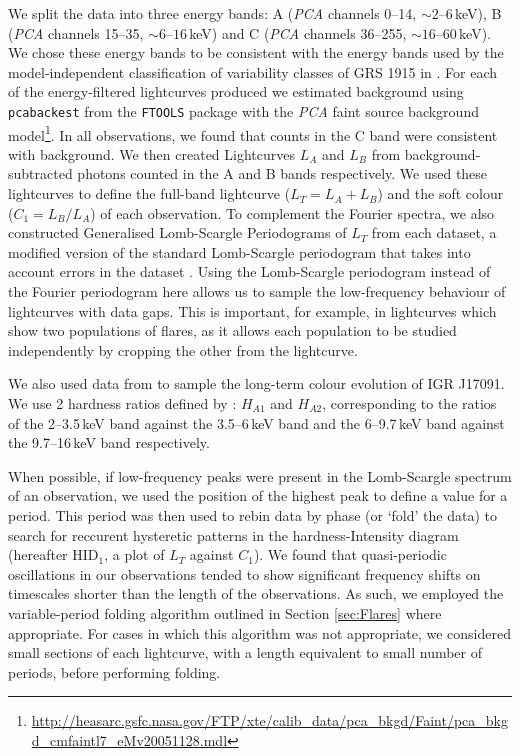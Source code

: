 \par We split the data into three energy bands: A (\textit{PCA} channels 0--14, $\sim2$--$6$\,keV), B (\textit{PCA} channels 15--35, $\sim6$--$16$\,keV) and C (\textit{PCA} channels 36--255, $\sim16$--$60$\,keV).  We chose these energy bands to be consistent with the energy bands used by the model-independent classification of variability classes of GRS 1915 in \citet{Belloni_GRS_MI}.  For each of the energy-filtered lightcurves produced we estimated background using \texttt{pcabackest} from the \texttt{FTOOLS} package \citep{Blackburn_FTools} with the \textit{PCA} faint source background model\footnote{\url{http://heasarc.gsfc.nasa.gov/FTP/xte/calib\_data/pca\_bkgd/Faint/pca\_bkgd\_cmfaintl7\_eMv20051128.mdl}}. In all observations, we found that counts in the C band were consistent with background.  We then created Lightcurves $L_A$ and $L_B$ from background-subtracted photons counted in the A and B bands respectively.  We used these lightcurves to define the full-band lightcurve ($L_T=L_A+L_B$) and the soft colour ($C_1=L_B/L_A$) of each observation.  To complement the Fourier spectra, we also constructed Generalised Lomb-Scargle Periodograms of $L_T$ from each dataset, a modified version of the standard Lomb-Scargle periodogram \citep{Lomb_LombScargle, Scargle_LombScargle} that takes into account errors in the dataset \citep{Irwin_LombScargle}.  Using the Lomb-Scargle periodogram instead of the Fourier periodogram here allows us to sample the low-frequency behaviour of lightcurves with data gaps.  This is important, for example, in lightcurves which show two populations of flares, as it allows each population to be studied independently by cropping the other from the lightcurve.
\par We also used data from \citealt{Altamirano_IGR_FH} to sample the long-term colour evolution of IGR J17091.  We use 2 hardness ratios defined by \citeauthor{Altamirano_IGR_FH}: $H_{A1}$ and $H_{A2}$, corresponding to the ratios of the 2--3.5\,keV band against the 3.5--6\,keV band and the 6--9.7\,keV band against the 9.7--16\,keV band respectively.
\par When possible, if low-frequency peaks were present in the Lomb-Scargle spectrum of an observation, we used the position of the highest peak to define a value for a period.  This period was then used to rebin data by phase (or `fold' the data) to search for reccurent hysteretic patterns in the hardness-Intensity diagram (hereafter HID$_1$, a plot of $L_T$ against $C_1$).  We found that quasi-periodic oscillations in our observations tended to show significant frequency shifts on timescales shorter than the length of the observations.  As such, we employed the variable-period folding algorithm outlined in Section \ref{sec:Flares} where appropriate.  For cases in which this algorithm was not appropriate, we considered small sections of each lightcurve, with a length equivalent to small number of periods, before performing folding.
